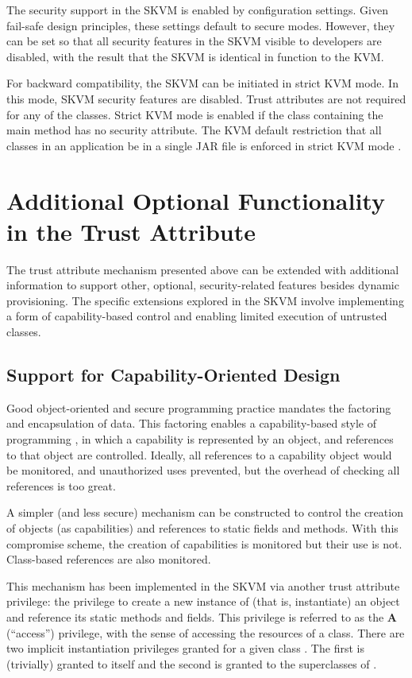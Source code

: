 \documentclass{llncs}
\begin{document}
The security support in the SKVM is enabled by configuration settings.
Given fail-safe design principles, these settings default to secure
modes. However, they can be set so that all security features in the
SKVM visible to developers are disabled, with the result that the SKVM
is identical in function to the KVM.

For backward compatibility, the SKVM can be initiated in strict KVM
mode. In this mode, SKVM security features are disabled. Trust
attributes are not required for any of the classes. Strict KVM mode is
enabled if the class containing the main method has no security
attribute. The KVM default restriction that all classes in an
application be in a single JAR file is enforced in strict KVM mode \cite[section 3.4.2.3]{cldc}.

\section{Additional Optional Functionality in the Trust Attribute}

The trust attribute mechanism presented above can be extended with
additional information to support other, optional, security-related
features besides dynamic provisioning. The specific extensions explored
in the SKVM involve implementing a form of capability-based control and
enabling limited execution of untrusted classes.

\subsection{Support for Capability-Oriented Design}

Good object-oriented and secure programming practice mandates the
factoring and encapsulation of data. This factoring enables a
capability-based style of programming \cite{dennis}, in which a capability is
represented by an object, and references to that object are controlled.
Ideally, all references to a capability object would be monitored, and
unauthorized uses prevented, but the overhead of checking all references
is too great.

A simpler (and less secure) mechanism can be constructed to control the
creation of objects (as capabilities) and references to static fields
and methods. With this compromise scheme, the creation of capabilities
is monitored but their use is not. Class-based references are also
monitored.

This mechanism has been implemented in the SKVM via another trust
attribute privilege: the privilege to create a new instance of (that is,
instantiate) an object and reference its static methods and fields. This
privilege is referred to as the {\bf A} (``access'') privilege, with the sense
of accessing the resources of a class. There are two implicit
instantiation privileges granted for a given class . The first is
(trivially) granted to  itself and the second is granted to the
superclasses of .
\end{document}
